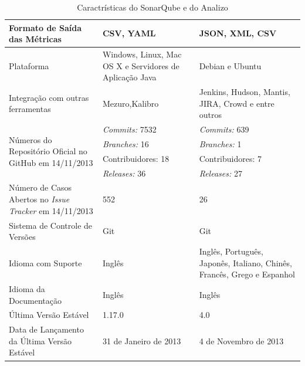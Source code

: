 \begin{savenotes}
\begin{table}[!ht]
\begin{tabular}{|p{5cm}|p{4.5cm}|p{5cm}|}
Formato de Saída das Métricas  & CSV, YAML & JSON, XML, CSV \\ \hline

Plataforma  &Windows, Linux, Mac OS X e Servidores de Aplicação Java & Debian e Ubuntu                                                                                              \\ \hline

Integração com outras ferramentas & Mezuro,Kalibro & Jenkins, Hudson, Mantis, JIRA, Crowd e entre outros \\ \hline

\multirow{4}{5cm}{Números do Repositório Oficial no GitHub em 14/11/2013}
& \textit{Commits:} 7532 & \textit{Commits:} 639\\ \cline{2-3} 

&\textit{Branches:} 16 & \textit{Branches:} 1  \\ \cline{2-3} 
& Contribuidores: 18 & Contribuidores: 7  \\ \cline{2-3} 
& \textit{Releases:} 36  & \textit{Releases:} 27

 \\ \hline

Número de Casos Abertos no \textit{Issue Tracker} em 14/11/2013 & 552  & 26 
\\ \hline

Sistema de Controle de Versões & Git & Git \\ \hline

Idioma com Suporte & Inglês & Inglês, Português, Japonês, Italiano, Chinês, Francês, Grego e Espanhol \\ \hline

Idioma da Documentação & Inglês & Inglês

\\ \hline
Última Versão Estável & 1.17.0 & 4.0  

\\ \hline
Data de Lançamento da Última Versão Estável & 31 de Janeiro de 2013 & 4 de Novembro de 2013

\\ \hline
\end{tabular}
\caption{Caractrísticas do SonarQube e do Analizo}
\label{dados-ferramentas-estatica}
\end{table}
\end{savenotes}

